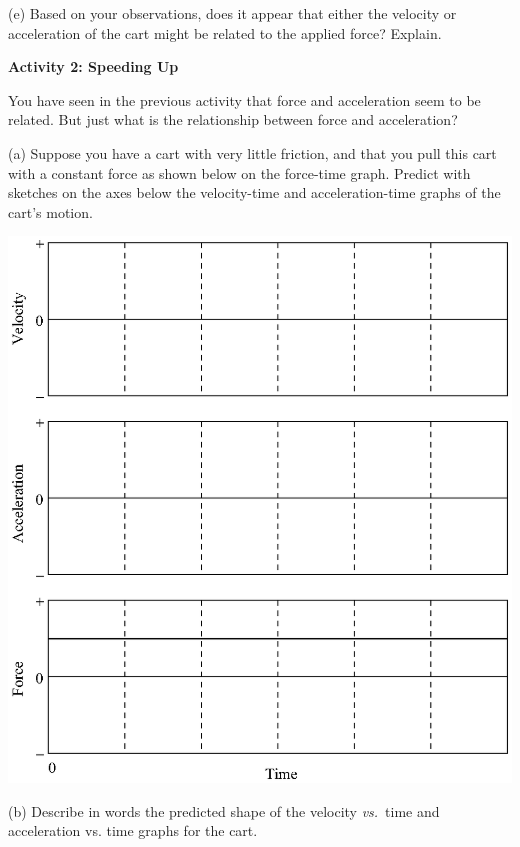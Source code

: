 (e) Based on your observations, does it appear that either the velocity or acceleration
of the cart might be related to the applied force? Explain.
\answerspace{20mm}

\pagebreak[3]
\textbf{Activity 2: Speeding Up }

You have seen in the previous activity that force and acceleration seem to be
related. But just what is the relationship between force and acceleration? 

(a) Suppose you have a cart with very little friction, and that you pull this
cart with a constant force as shown below on the force-time graph. Predict with sketches on
the axes below the velocity-time and acceleration-time graphs of the cart's motion.

\vspace{0.3cm}
{\par\centering \includegraphics{force1/force1_fig3.eps} \par}
\vspace{0.3cm}

(b) Describe in words the predicted shape of the velocity \textit{vs.}~time and acceleration
vs. time graphs for the cart.
\vspace{20mm}

